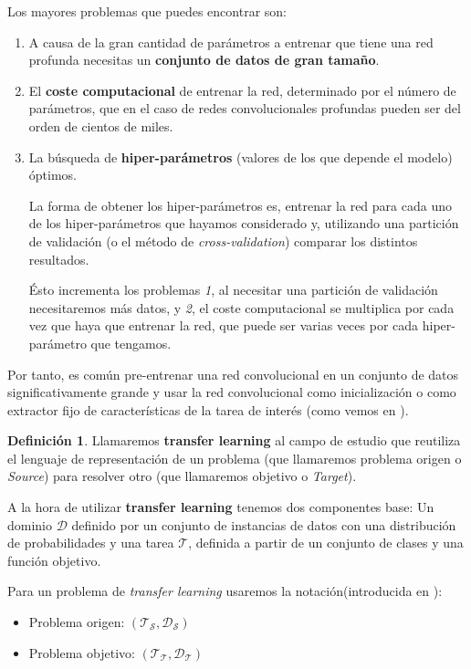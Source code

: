 \documentclass[12,twoside]{TFG-GM}
\theoremstyle{definition}
\newtheorem{definition}[theorem]{Definición}
\theoremstyle{remark}
\begin{document}
Los mayores problemas que puedes encontrar son: 
\begin{enumerate}
\item A causa de la gran cantidad de parámetros a entrenar que tiene una red profunda necesitas un \textbf{conjunto de datos de gran tamaño}.
\item El \textbf{coste computacional} de entrenar la red, determinado por el número de parámetros, que en el caso de redes convolucionales  profundas pueden ser del orden de cientos de miles. 
\item La búsqueda de \textbf{hiper-parámetros} (valores de los que depende el modelo) óptimos. \par

La forma de obtener los hiper-parámetros es, entrenar la red para cada uno de los hiper-parámetros que hayamos considerado y, utilizando una partición de validación (o el método de \textit{cross-validation}) comparar los distintos resultados.  \par

Ésto incrementa los problemas \textit{1}, al necesitar una partición de validación necesitaremos más datos, y \textit{2}, el coste computacional se multiplica por cada vez que haya que entrenar la red, que puede ser varias veces por cada hiper-parámetro que tengamos.
\end{enumerate}\par
Por tanto, es común pre-entrenar una red convolucional en un conjunto de datos significativamente grande y usar la red convolucional como inicialización o como extractor fijo de características de la tarea de interés (como vemos en \cite{he2016deep}). 
\begin{definition}
Llamaremos \textbf{transfer learning} al campo de estudio que reutiliza el lenguaje de representación de un problema (que llamaremos problema origen o \textit{Source}) para resolver otro (que llamaremos objetivo o \textit{Target}). 

A la hora de utilizar \textbf{transfer learning} tenemos dos componentes base:  Un dominio $\mathcal{D}$ definido por un conjunto de instancias de datos con una distribución de probabilidades y una tarea $\mathcal{T}$, definida a partir de un conjunto de clases y una función objetivo.

Para un problema de \textit{transfer learning} usaremos la notación(introducida en \cite{pan2010survey}): 
\begin{itemize}
\item Problema origen: $(\mathcal{T_S},\mathcal{D_S})$
\item Problema objetivo: $(\mathcal{T_T},\mathcal{D_T})$
\end{itemize}

\end{definition}
\end{document}
